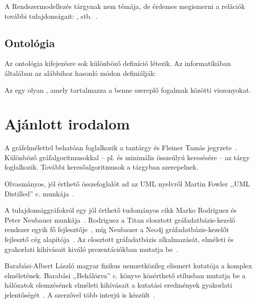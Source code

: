 A Rendszermodellezés tárgynak nem témája, de érdemes megismerni a relációk további tulajdonságait: ,  stb.~\cite{relaciok}. 

\subsection{Ontológia}

Az ontológia kifejezésre sok különböző definíció létezik. Az informatikában általában az alábbihoz hasonló módon definiálják:

\begin{definicio}
Az  egy olyan , amely tartalmazza a benne szereplő fogalmak közötti viszonyokat. 
\end{definicio}


\section{Ajánlott irodalom}

A gráfelmélettel behatóan foglalkozik a \bszketto tantárgy és Fleiner Tamás jegyzete~\cite{FleinerJegyzet}. Különböző gráfalgoritmusokkal -- pl.  és minimális összsúlyú  keresésére -- az \algel tárgy foglalkozik. További keresőalgoritmusok a \mestersegesintelligencia tárgyban szerepelnek.

Olvasmányos, jól érthető összefoglalót ad az UML nyelvről Martin Fowler ,,UML Distilled'' c. munkája~\cite{fowler1997uml}.

A tulajdonsággráfokról egy jól érthető tudományos cikk Marko Rodriguez és Peter Neubauer munkája~\cite{Rodriguez2010}. Rodriguez a Titan elosztott gráfadatbázis-kezelő rendszer egyik fő fejlesztője~\cite{Titan}, míg Neubauer a Neo4j gráfadatbázis-kezelőt fejlesztő cég alapítója~\cite{Neo4j}. Az elosztott gráfadatbázis alkalmazását, elméleti és gyakorlati kihívásait kiváló prezentációkban mutatja be~\cite{RodriguezSlides2012,RodriguezSlides2013}.

Barabási-Albert László magyar fizikus nemzetközileg elismert kutatója a komplex  elméletének. Barabási ,,Behálózva'' c. könyve közérthető stílusban mutatja be a hálózatok elemzésének elméleti kihívásait a kutatási eredmények gyakorlati jelentőségét~\cite{behalozva}. A szerzővel több interjú is készült~\cite{barabasi1,barabasi2,barabasi3}.

